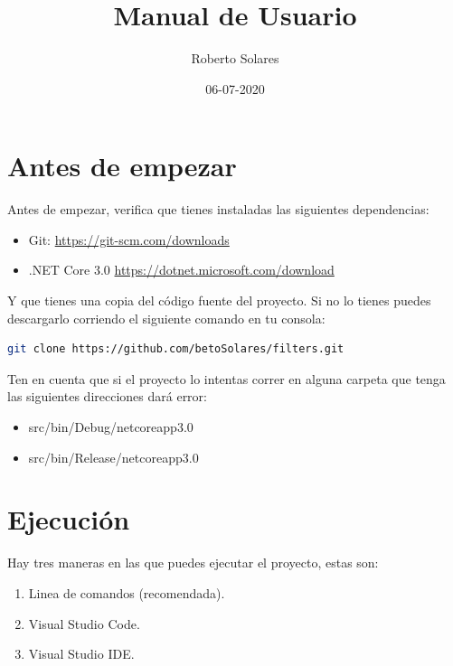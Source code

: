 \documentclass[12pt]{article}
\title{Manual de Usuario}
\author{Roberto Solares}
\date{06-07-2020}
\begin{document}
\begin{titlingpage}
	\maketitle
\end{titlingpage}

\tableofcontents
\newpage

\section{Antes de empezar}

Antes de empezar, verifica que tienes instaladas las siguientes dependencias:

\begin{itemize}
	\item Git: \url{https://git-scm.com/downloads}
	\item .NET Core 3.0 \url{https://dotnet.microsoft.com/download}
\end{itemize}

Y que tienes una copia del código fuente del proyecto. Si no lo tienes puedes descargarlo corriendo el siguiente
 comando en tu consola:

\begin{lstlisting}[language=bash]
git clone https://github.com/betoSolares/filters.git
\end{lstlisting}

Ten en cuenta que si el proyecto lo intentas correr en alguna carpeta que tenga las siguientes direcciones dará error:

\begin{itemize}
	\item src/bin/Debug/netcoreapp3.0
	\item src/bin/Release/netcoreapp3.0
\end{itemize}

\section{Ejecución}

Hay tres maneras en las que puedes ejecutar el proyecto, estas son:

\begin{enumerate}
	\item Linea de comandos (recomendada).
	\item Visual Studio Code.
	\item Visual Studio IDE.
\end{enumerate}
\end{document}
